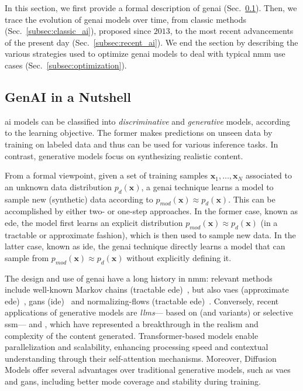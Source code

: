 
In this section, we first provide a formal description of \gls{genai} (Sec.~\ref{subsec:genai_nutshell}). Then, we trace the evolution of \gls{genai} models over time, from classic methods (Sec.~\ref{subsec:classic_ai}), proposed since $2013$, to the most recent advancements of the present day (Sec.~\ref{subsec:recent_ai}).
We end the section by describing the various strategies used to optimize \gls{genai} models to deal with typical \gls{nmm} use cases (Sec.~\ref{subsec:optimization}).
\subsection{GenAI in a Nutshell}
\label{subsec:genai_nutshell}
\gls{ai} models can
be classified into \emph{discriminative} and \emph{generative} models, according to the learning objective. The former makes predictions on unseen data by training on labeled data and thus can be used for various inference tasks. 
In contrast, generative models focus on synthesizing realistic content. 

From a formal viewpoint, given a set of training samples $\bm{x}_1,\ldots, \bm{x}_N$ associated to an unknown data distribution $p_d(\bm{x})$, a \gls{genai} technique learns a model to sample new (synthetic) data according to $p_{mod}(\bm{x}) \approx p_d(\bm{x})$.
This can be accomplished by either two- or one-step approaches.
In the former case, known as \gls{ede}, the model first learns an explicit distribution $p_{mod}(\bm{x}) \approx p_d(\bm{x})$ (in a tractable or approximate fashion), which is then used to sample new data.
In the latter case, known as \gls{ide}, the \gls{genai} technique directly learns a model that can sample from $p_{mod}(\bm{x}) \approx p_d(\bm{x})$ without explicitly defining it.

The design and use of \gls{genai} have a long history in \gls{nmm}: relevant methods include well-known Markov chains (tractable \gls{ede})~\cite{aceto2021characterization}, but also \glspl{vae} (approximate \gls{ede})~\cite{aceto2024synthetic}, \glspl{gan} (\gls{ide})~\cite{hui2022knowledge} and normalizing-flows (tractable \gls{ede})~\cite{gudovskiy2022cflow}.
Conversely, recent applications of generative models are \emph{\glspl{llm}}---%
based on  (and variants) or 
selective \gls{ssm}---%
and , which have represented a breakthrough in the realism and complexity of the content generated.
Transformer-based models enable parallelization and scalability, enhancing processing speed and contextual understanding through their self-attention mechanisms.
Moreover, Diffusion Models offer several advantages over traditional generative models, such as \glspl{vae} and \glspl{gan}, including better mode coverage and stability during training.




